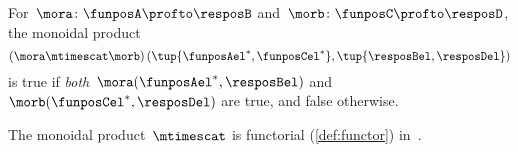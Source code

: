 \begin{remark}
  For~$\mora \colon \funposA\profto \resposB$ and~$\morb \colon \funposC \profto \resposD$, the monoidal product
  \begin{equation}
    \left(\mora \mtimescat \morb\right)(\tup{\funposAel^*, \funposCel^*}, \tup{\resposBel,\resposDel})
  \end{equation}
  is true if \emph{both}~$\mora(\funposAel^*,\resposBel)$ and~$\morb(\funposCel^*,\resposDel)$ are true, and false otherwise.
\end{remark}


\begin{lemma}
  \label{lem:monoidal_functorial}
  The monoidal product~$\mtimescat$ is functorial (\cref{def:functor}) in~\DP.
\end{lemma}
